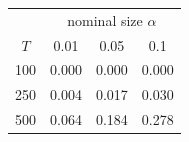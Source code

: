 % 
\begin{tabular}{cccc}
  \hline
  & \multicolumn{3}{c}{nominal size $\alpha$} \\
 $T$ & 0.01 & 0.05 & 0.1 \\
 \hline
100 & 0.000 & 0.000 & 0.000 \\ 
  250 & 0.004 & 0.017 & 0.030 \\ 
  500 & 0.064 & 0.184 & 0.278 \\ 
   \hline
\end{tabular}
